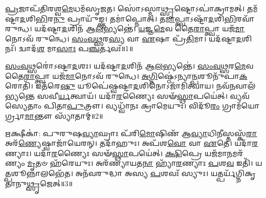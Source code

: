 \setcounter{anuvakam}{0}

\-\ul{𑌪𑍍𑌰}\-𑌜𑌾𑌪᳴𑌤𑌿𑌰𑌶𑍍𑌵\-\ul{𑌮𑍇}\-𑌧𑌮᳴\-𑌸𑍃𑌜𑌤।
𑌸𑍋॑𑌽𑌸𑍍𑌮𑌾\-\ul{𑌥𑍍𑌸𑍃}\-𑌷𑍍𑌟𑍋\-𑌽𑌪𑌾॑𑌕𑍍𑌰𑌾𑌮𑌤𑍍।
𑌤𑌮᳴𑌷𑍍𑌟𑌾\-\ul{𑌦}\-𑌶𑌿\-\ul{𑌭𑌿}\-𑌰\-\ul{𑌨𑍁}\- 𑌪𑍍𑌰𑌾𑌯𑍁᳴𑌙𑍍𑌕𑍍𑌤।
𑌤𑌮𑌾॑𑌪𑍍𑌨𑍋𑌤𑍍।
𑌤\-\ul{𑌮𑌾}\-𑌪𑍍𑌤𑍍𑌵𑌾\-𑌽𑌷𑍍𑌟𑌾᳴\-\ul{𑌦}\-𑌶𑌿\-\ul{𑌭𑌿}\-𑌰𑌵𑌾᳴\-𑌰𑍁𑌨𑍍𑌧।
𑌯𑌦᳴𑌷𑍍𑌟𑌾\-\ul{𑌦}\-𑌶𑌿𑌨᳴ 𑌆\-\ul{𑌲}\-𑌭𑍍𑌯𑌨𑍍𑌤𑍇॑।
\-\ul{𑌯}\-𑌜𑍍𑌞\-\ul{𑌮𑍇}\-𑌵 𑌤𑍈\-\ul{𑌰𑌾}\-𑌪𑍍𑌤𑍍𑌵𑌾 𑌯𑌜᳴\-\ul{𑌮𑌾}\-𑌨𑍋\-𑌽𑌵᳴ 𑌰𑍁𑌨𑍍𑌧𑍇।
\-\ul{𑌸𑌂}\-\-\ul{𑌵}\-\-\ul{𑌥𑍍𑌸}\-𑌰\-\ul{𑌸𑍍𑌯} 𑌵𑌾 \ul{𑌏}\-𑌷𑌾 𑌪𑍍𑌰᳴\-\ul{𑌤𑌿}\-𑌮𑌾।
𑌯𑌦᳴𑌷𑍍𑌟𑌾\-\ul{𑌦}\-𑌶𑌿𑌨𑌃᳴।
𑌦𑍍𑌵𑌾𑌦᳴\-\ul{𑌶} 𑌮𑌾\-\ul{𑌸𑌾𑌃} 𑌪\-\ul{𑌞𑍍𑌚}\-𑌰𑍍𑌤𑌵𑌃᳴॥1॥

\-\ul{𑌸𑌂}\-\-\ul{𑌵}\-\-\ul{𑌥𑍍𑌸}\-𑌰𑍋॑\-𑌽𑌷𑍍𑌟𑌾\-\ul{𑌦}\-𑌶𑌃।
𑌯𑌦᳴𑌷𑍍𑌟𑌾\-\ul{𑌦}\-𑌶𑌿𑌨᳴ 𑌆\-\ul{𑌲}\-𑌭𑍍𑌯𑌨𑍍𑌤𑍇॑।
\-\ul{𑌸𑌂}\-\-\ul{𑌵}\-\-\ul{𑌥𑍍𑌸}\-𑌰\-\ul{𑌮𑍇}\-𑌵 𑌤𑍈\-\ul{𑌰𑌾}\-𑌪𑍍𑌤𑍍𑌵𑌾 𑌯𑌜᳴\-\ul{𑌮𑌾}\-𑌨𑍋\-𑌽𑌵᳴ 𑌰𑍁𑌨𑍍𑌧𑍇।
\-\ul{𑌅}\-\-\ul{𑌗𑍍𑌨𑌿}\-𑌷𑍍𑌠𑍇॑\-𑌽𑌨𑍍𑌯𑌾\-\ul{𑌨𑍍𑌪}\-𑌶𑍂𑌨𑍁᳴𑌪𑌾\-\ul{𑌕}\-𑌰𑍋𑌤𑌿᳴।
𑌇𑌤᳴𑌰𑍇\-\ul{𑌷𑍁} 𑌯𑍂𑌪𑍇॑𑌷𑍍𑌵𑌷𑍍𑌟𑌾\-\ul{𑌦}\-𑌶𑌿𑌨𑍋\-𑌽𑌜𑌾᳴𑌮𑌿𑌤𑍍𑌵𑌾𑌯।
𑌨𑌵᳴\-\ul{𑌨}\-𑌵𑌾𑌲᳴𑌭𑍍𑌯𑌨𑍍𑌤𑍇 𑌸𑌵𑍀\-\ul{𑌰𑍍𑌯}\-𑌤𑍍𑌵𑌾𑌯᳴।
𑌯𑌦𑌾᳴\-\ul{𑌰}\-𑌣𑍍𑌯𑍈𑌃 𑌸𑍟᳴\-\ul{𑌸𑍍𑌥𑌾}\-𑌪𑌯𑍇॑𑌤𑍍।
𑌵𑍍𑌯𑌵᳴𑌸𑍍𑌯𑍇𑌤𑌾𑌂 𑌪𑌿𑌤𑌾\-\ul{𑌪𑍁}\-𑌤𑍍𑌰𑍗।
𑌵𑍍𑌯𑌧𑍍𑌵𑌾᳴𑌨𑌃 𑌕𑍍𑌰𑌾𑌮𑍇𑌯𑍁𑌃।
𑌵𑌿𑌦𑍂᳴\-\ul{𑌰𑌂} 𑌗𑍍𑌰𑌾𑌮᳴𑌯𑍋𑌰𑍍𑌗𑍍𑌰𑌾\-\ul{𑌮𑌾}\-𑌨𑍍𑌤𑍗 𑌸𑍍𑌯𑌾᳴𑌤𑌾𑌮𑍍॥2॥

\-\ul{𑌋}\-𑌕𑍍𑌷𑍀𑌕𑌾॑: 𑌪𑍁𑌰𑍁𑌷\-\ul{𑌵𑍍𑌯𑌾}\-𑌘𑍍𑌰𑌾𑌃 𑌪᳴𑌰𑌿\-\ul{𑌮𑍋}\-𑌷𑌿𑌣᳴ 𑌆\-\ul{𑌵𑍍𑌯𑌾}\-𑌧𑌿\-\ul{𑌨𑍀}\-𑌸𑍍𑌤𑌸𑍍𑌕᳴\-\ul{𑌰𑌾} 𑌅𑌰᳴\-\ul{𑌣𑍍𑌯𑍇}\-𑌷𑍍𑌵𑌾𑌜𑌾᳴𑌯𑍇𑌰𑌨𑍍।
𑌤𑌦𑌾᳴𑌹𑍁𑌃।
𑌅𑌪᳴𑌶\-\ul{𑌵𑍋} 𑌵𑌾 \ul{𑌏}\-𑌤𑍇।
𑌯𑌦𑌾᳴\-\ul{𑌰}\-𑌣𑍍𑌯𑌾𑌃।
𑌯𑌦𑌾᳴\-\ul{𑌰}\-𑌣𑍍𑌯𑍈𑌃 𑌸𑍟᳴\-\ul{𑌸𑍍𑌥𑌾}\-𑌪𑌯𑍇॑𑌤𑍍।
\-\ul{𑌕𑍍𑌷𑌿}\-𑌪𑍍𑌰𑍇 𑌯𑌜᳴𑌮𑌾\-\ul{𑌨}\-𑌮𑌰᳴𑌣𑍍𑌯𑌂 \ul{𑌮𑍃}\-𑌤𑍞 𑌹᳴𑌰𑍇𑌯𑍁𑌃।
𑌅𑌰᳴𑌣𑍍𑌯𑌾𑌯𑌤\-\ul{𑌨𑌾} 𑌹𑍍𑌯𑌾᳴\-\ul{𑌰}\-𑌣𑍍𑌯𑌾𑌃 \ul{𑌪}\-𑌶\-\ul{𑌵} 𑌇𑌤𑌿᳴।
𑌯\-\ul{𑌤𑍍𑌪}\-𑌶𑍂𑌨𑍍𑌨𑌾𑌲𑌭𑍇᳴𑌤।
𑌅𑌨᳴𑌵𑌰𑍁𑌦𑍍𑌧𑌾 𑌅𑌸𑍍𑌯 \ul{𑌪}\-𑌶𑌵𑌃᳴ 𑌸𑍍𑌯𑍁𑌃।
𑌯𑌤𑍍𑌪𑌰𑍍𑌯᳴𑌗𑍍𑌨𑌿𑌕𑍃𑌤𑌾𑌨𑍁\-\ul{𑌥𑍍𑌸𑍃}\-𑌜𑍇𑌤𑍍॥3॥

